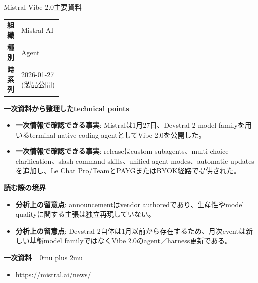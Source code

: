 \begin{technicalnote}{Mistral Vibe 2.0}{主要資料}
\begingroup
\begin{tabularx}{\linewidth}{@{}>{\bfseries}p{0.22\linewidth}X@{}}
組織 & Mistral AI \\
種別 & Agent \\
時系列 & 2026-01-27 (製品公開) \\
\end{tabularx}
\smallskip
{\bfseries 一次資料から整理したtechnical points}
\begin{itemize}[leftmargin=1.5em,itemsep=0.35em]
\item \textbf{一次情報で確認できる事実}: Mistralは1月27日、Devstral 2 model familyを用いるterminal-native coding agentとしてVibe 2.0を公開した。
\item \textbf{一次情報で確認できる事実}: releaseはcustom subagents、multi-choice clarification、slash-command skills、unified agent modes、automatic updatesを追加し、Le Chat Pro/TeamとPAYGまたはBYOK経路で提供された。
\end{itemize}
\begin{minipage}{\linewidth}
{\bfseries 読む際の境界}
\begin{itemize}[leftmargin=1.5em,itemsep=0.35em]
\item \textbf{分析上の留意点}: announcementはvendor authoredであり、生産性やmodel qualityに関する主張は独立再現していない。
\item \textbf{分析上の留意点}: Devstral 2自体は1月以前から存在するため、月次eventは新しい基盤model familyではなくVibe 2.0のagent／harness更新である。
\end{itemize}
\begin{samepage}
{\bfseries 一次資料}
\begingroup\sloppy
\Urlmuskip=0mu plus 2mu\relax
\begin{itemize}[leftmargin=1.5em,itemsep=0.25em]
\item {\scriptsize\url{https://mistral.ai/news/}}
\end{itemize}
\endgroup
\end{samepage}
\end{minipage}
\endgroup
\end{technicalnote}
\medskip

